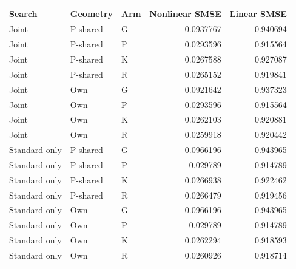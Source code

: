 \begin{tabular}{@{}lllrr@{}}
\toprule
Search & Geometry & Arm & Nonlinear SMSE & Linear SMSE \\
\midrule
Joint & P-shared & G & 0.0937767 & 0.940694 \\
Joint & P-shared & P & 0.0293596 & 0.915564 \\
Joint & P-shared & K & 0.0267588 & 0.927087 \\
Joint & P-shared & R & 0.0265152 & 0.919841 \\
Joint & Own & G & 0.0921642 & 0.937323 \\
Joint & Own & P & 0.0293596 & 0.915564 \\
Joint & Own & K & 0.0262103 & 0.920881 \\
Joint & Own & R & 0.0259918 & 0.920442 \\
Standard only & P-shared & G & 0.0966196 & 0.943965 \\
Standard only & P-shared & P & 0.029789 & 0.914789 \\
Standard only & P-shared & K & 0.0266938 & 0.922462 \\
Standard only & P-shared & R & 0.0266479 & 0.919456 \\
Standard only & Own & G & 0.0966196 & 0.943965 \\
Standard only & Own & P & 0.029789 & 0.914789 \\
Standard only & Own & K & 0.0262294 & 0.918593 \\
Standard only & Own & R & 0.0260926 & 0.918714 \\
\bottomrule
\end{tabular}
